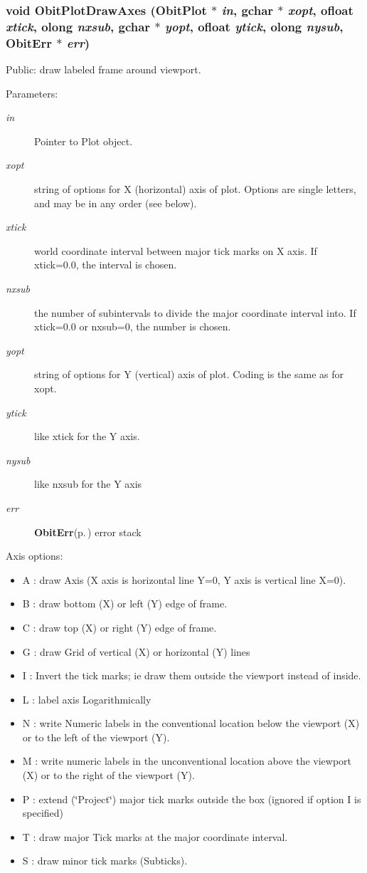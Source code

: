 \subsubsection{\setlength{\rightskip}{0pt plus 5cm}void Obit\-Plot\-Draw\-Axes ({\bf Obit\-Plot} $\ast$ {\em in}, gchar $\ast$ {\em xopt}, {\bf ofloat} {\em xtick}, {\bf olong} {\em nxsub}, gchar $\ast$ {\em yopt}, {\bf ofloat} {\em ytick}, {\bf olong} {\em nysub}, {\bf Obit\-Err} $\ast$ {\em err})}\label{ObitPlot_8c_a19}


Public: draw labeled frame around viewport. 

\begin{Desc}
\item[Parameters:]
\begin{description}
\item[{\em in}]Pointer to Plot object. \item[{\em xopt}]string of options for X (horizontal) axis of plot. Options are single letters, and may be in any order (see below). \item[{\em xtick}]world coordinate interval between major tick marks on X axis. If xtick=0.0, the interval is chosen. \item[{\em nxsub}]the number of subintervals to divide the major coordinate interval into. If xtick=0.0 or nxsub=0, the number is chosen. \item[{\em yopt}]string of options for Y (vertical) axis of plot. Coding is the same as for xopt. \item[{\em ytick}]like xtick for the Y axis. \item[{\em nysub}]like nxsub for the Y axis \item[{\em err}]{\bf Obit\-Err}{\rm (p.\,\pageref{structObitErr})} error stack\end{description}
\end{Desc}
Axis options: \begin{itemize}
\item A : draw Axis (X axis is horizontal line Y=0, Y axis is vertical line X=0). \item B : draw bottom (X) or left (Y) edge of frame. \item C : draw top (X) or right (Y) edge of frame. \item G : draw Grid of vertical (X) or horizontal (Y) lines \item I : Invert the tick marks; ie draw them outside the viewport instead of inside. \item L : label axis Logarithmically \item N : write Numeric labels in the conventional location below the viewport (X) or to the left of the viewport (Y). \item M : write numeric labels in the unconventional location above the viewport (X) or to the right of the viewport (Y). \item P : extend (\char`\"{}Project\char`\"{}) major tick marks outside the box (ignored if option I is specified) \item T : draw major Tick marks at the major coordinate interval. \item S : draw minor tick marks (Subticks). \end{itemize}

